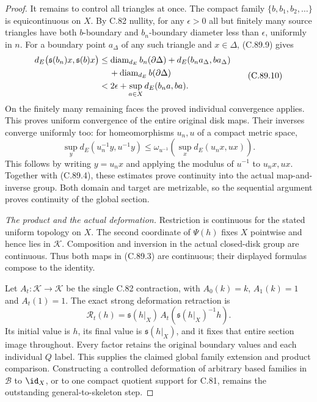 \begin{proof}
It remains to control all
triangles at once. The compact
family $\{b,b_1,b_2,\ldots\}$
is equicontinuous on $X$.
By C.82 nullity, for any
$\epsilon>0$ all but finitely
many source triangles have both
$b$-boundary and $b_n$-boundary
diameter less than $\epsilon$,
uniformly in $n$.
For a boundary point $a_\Delta$
of any such triangle and
$x\in\Delta$, (C.89.9) gives
\[
 \begin{split}
 d_E\bigl(\mathfrak s(b_n)x,\mathfrak s(b)x\bigr)
   &\leq
       \operatorname{diam}_{d_E}b_n(\partial\Delta)
       +d_E(b_n a_\Delta,b a_\Delta)\\
   &\hspace{1.2em}
       +\operatorname{diam}_{d_E}b(\partial\Delta)\\
   &<2\epsilon+\sup_{a\in X}d_E(b_n a,b a).
 \end{split}                                                   \tag{C.89.10}
\]
On the finitely many remaining
faces the proved individual
convergence applies. This proves
uniform convergence of the entire
original disk maps.
Their inverses converge uniformly
too: for homeomorphisms $u_n,u$
of a compact metric space,
\[
 \sup_y d_E(u_n^{-1}y,u^{-1}y)
       \leq
 \omega_{u^{-1}}\!
       \left(\sup_x d_E(u_nx,ux)\right).                        \tag{C.89.11}
\]
This follows by writing $y=u_nx$
and applying the modulus of
$u^{-1}$ to $u_nx,ux$.
Together with (C.89.4), these
estimates prove continuity into
the actual map-and-inverse group.
Both domain and target are
metrizable, so the sequential
argument proves continuity of
the global section.

\emph{The product and the actual deformation.}
Restriction is continuous for
the stated uniform topology
on $X$. The second coordinate
of $\Psi(h)$ fixes $X$
pointwise and hence lies in
$\mathscr K$.
Composition and inversion in
the actual closed-disk group
are continuous. Thus both
maps in (C.89.3) are continuous;
their displayed formulas
compose to the identity.

Let $A_t:\mathscr K\to\mathscr K$
be the single C.82 contraction,
with $A_0(k)=k$, $A_1(k)=1$
and $A_t(1)=1$.
The exact strong deformation
retraction is
\[
 \mathcal R_t(h)=
   \mathfrak s(h|_X)\,
   A_t\!\left(\mathfrak s(h|_X)^{-1}h\right).
                                                                  \tag{C.89.12}
\]
Its initial value is $h$,
its final value is
$\mathfrak s(h|_X)$, and it
fixes that entire section
image throughout.
Every factor retains the
original boundary values and
each individual $Q$ label.
This supplies the claimed
global family extension and
product comparison.
Constructing a controlled
deformation of arbitrary
based families in $\mathscr B$
to $\id_X$, or to one compact
quotient support for C.81,
remains the outstanding
general-to-skeleton step.
\end{proof}
